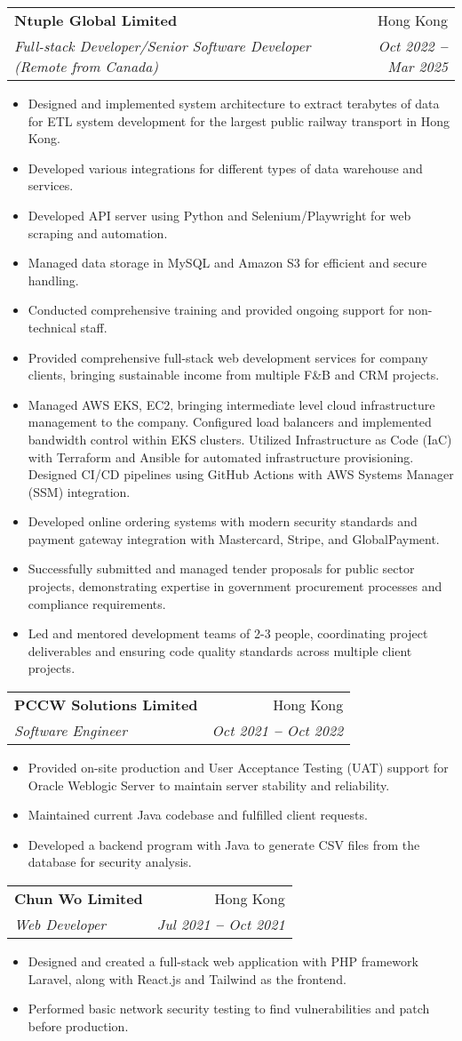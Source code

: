 \documentclass[letterpaper,11pt]{article}
\makeatletter
\newcommand{\resumeItem}[1]{
  \item\small{
    {#1 \vspace{-2pt}}
  }
}
\newcommand{\resumeSubheading}[4]{
  \vspace{-2pt}\item
    \begin{tabular*}{0.97\textwidth}[t]{l@{\extracolsep{\fill}}r}
      \textbf{#1} & #2 \\
      \textit{\small#3} & \textit{\small #4} \\
    \end{tabular*}\vspace{-7pt}
}
\newcommand{\resumeItemListStart}{\begin{itemize}}
\newcommand{\resumeItemListEnd}{\end{itemize}\vspace{-5pt}}
\makeatother
\begin{document}
    \resumeSubheading
      {Ntuple Global Limited}{Hong Kong}
      {Full-stack Developer/Senior Software Developer (Remote from Canada)}{Oct 2022 \textbf{--} Mar 2025}
        \resumeItemListStart
            \resumeItem{Designed and implemented system architecture to extract terabytes of data for ETL system development for the largest public railway transport in Hong Kong.}
            \resumeItem{Developed various integrations for different types of data warehouse and services.}
            \resumeItem{Developed API server using Python and Selenium/Playwright for web scraping and automation.}
            \resumeItem{Managed data storage in MySQL and Amazon S3 for efficient and secure handling.}
            \resumeItem{Conducted comprehensive training and provided ongoing support for non-technical staff.}
            \resumeItem{Provided comprehensive full-stack web development services for company clients, bringing sustainable income from multiple F\&B and CRM projects.}
            \resumeItem{Managed AWS EKS, EC2, bringing intermediate level cloud infrastructure management to the company. Configured load balancers and implemented bandwidth control within EKS clusters. Utilized Infrastructure as Code (IaC) with Terraform and Ansible for automated infrastructure provisioning. Designed CI/CD pipelines using GitHub Actions with AWS Systems Manager (SSM) integration.}
            \resumeItem{Developed online ordering systems with modern security standards and payment gateway integration with Mastercard, Stripe, and GlobalPayment.}
            \resumeItem{Successfully submitted and managed tender proposals for public sector projects, demonstrating expertise in government procurement processes and compliance requirements.}
            \resumeItem{Led and mentored development teams of 2-3 people, coordinating project deliverables and ensuring code quality standards across multiple client projects.}
        \resumeItemListEnd

    \resumeSubheading
      {PCCW Solutions Limited}{Hong Kong}
      {Software Engineer}{Oct 2021 \textbf{--} Oct 2022}
        \resumeItemListStart
            \resumeItem{Provided on-site production and User Acceptance Testing (UAT) support for Oracle Weblogic Server to maintain server stability and reliability.}
            \resumeItem{Maintained current Java codebase and fulfilled client requests.}
            \resumeItem{Developed a backend program with Java to generate CSV files from the database for security analysis.}
        \resumeItemListEnd

    \resumeSubheading
      {Chun Wo Limited}{Hong Kong}
      {Web Developer}{Jul 2021 \textbf{--} Oct 2021}
        \resumeItemListStart
            \resumeItem{Designed and created a full-stack web application with PHP framework Laravel, along with React.js and Tailwind as the frontend.}
            \resumeItem{Performed basic network security testing to find vulnerabilities and patch before production.}
        \resumeItemListEnd
    
\end{document}
